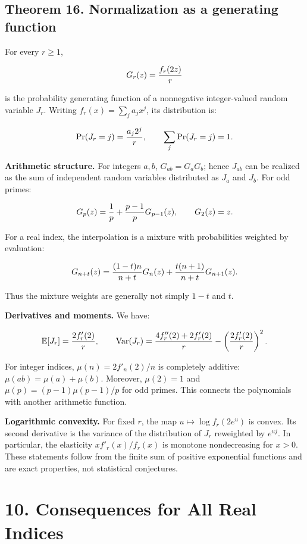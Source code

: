 \documentclass[11pt,a4paper]{article}
\newcommand{\fitmath}[1]{\begingroup\setbox0=\hbox{$\displaystyle #1$}\ifdim\wd0>\linewidth\resizebox{\linewidth}{!}{\box0}\else\box0\fi\endgroup}
\begin{document}
\subsection*{Theorem 16. Normalization as a generating function}

For every $r\geq1$,


\[
\fitmath{G_r(z)=\frac{f_r(2z)}r}
\]


is the probability generating function of a nonnegative integer-valued random variable $J_r$. Writing $f_r(x)=\sum_j a_jx^j$, its distribution is:


\[
\fitmath{\Pr(J_r=j)=\frac{a_j2^j}r,\qquad \sum_j\Pr(J_r=j)=1.}
\]


\textbf{Arithmetic structure.} For integers $a,b$, $G_{ab}=G_aG_b$; hence $J_{ab}$ can be realized as the sum of independent random variables distributed as $J_a$ and $J_b$. For odd primes:


\[
\fitmath{G_p(z)=\frac1p+\frac{p-1}{p}G_{p-1}(z),\qquad G_2(z)=z.}
\]


For a real index, the interpolation is a mixture with probabilities weighted by evaluation:


\[
\fitmath{G_{n+t}(z)=\frac{(1-t)n}{n+t}G_n(z)+\frac{t(n+1)}{n+t}G_{n+1}(z).}
\]


Thus the mixture weights are generally not simply $1-t$ and $t$.


\textbf{Derivatives and moments.} We have:


\[
\fitmath{\mathbb E[J_r]=\frac{2f'_r(2)}r,\qquad \operatorname{Var}(J_r)=\frac{4f''_r(2)+2f'_r(2)}r-\left(\frac{2f'_r(2)}r\right)^2.}
\]


For integer indices, $\mu(n)=2f'_n(2)/n$ is completely additive: $\mu(ab)=\mu(a)+\mu(b)$. Moreover, $\mu(2)=1$ and $\mu(p)=(p-1)\mu(p-1)/p$ for odd primes. This connects the polynomials with another arithmetic function.


\textbf{Logarithmic convexity.} For fixed $r$, the map $u\mapsto\log f_r(2e^u)$ is convex. Its second derivative is the variance of the distribution of $J_r$ reweighted by $e^{uj}$. In particular, the elasticity $x f'_r(x)/f_r(x)$ is monotone nondecreasing for $x>0$. These statements follow from the finite sum of positive exponential functions and are exact properties, not statistical conjectures.


\section*{10. Consequences for All Real Indices}
\end{document}
